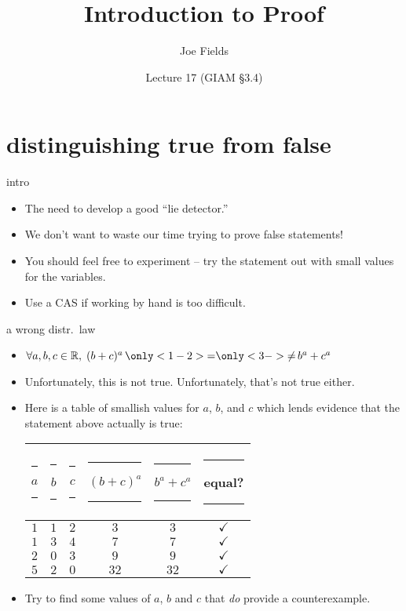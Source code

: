 \documentclass[handout,landscape]{beamer}
\author{Joe Fields}
\title{Introduction to Proof}
\date{Lecture 17 (GIAM \S 3.4)}
\institute[SCSU]{ {\tt fieldsj1@southernct.edu} }
\begin{document}
\begin{frame}[plain]
  \titlepage
\end{frame}

\section{distinguishing true from false}

\begin{frame}{intro}
\begin{itemize}
\item The need to develop a good ``lie detector.'' \pause
\item We don't want to waste our time trying to prove false statements! \pause
\item You should feel free to experiment -- try the statement out with small values for the variables. \pause
\item Use a CAS if working by hand is too difficult.
\end{itemize}
\end{frame}

\begin{frame}{a wrong distr.\ law}
\begin{itemize}
\item $\forall a,b,c \in \Reals, \; (b+c)^a \, \only<1-2>{=} \only<3->{\neq} \, b^a + c^a$ \pause
\item Unfortunately, this is not true. \pause \pause Unfortunately, that's not true either. \pause
\item Here is a table of smallish values for $a$, $b$, and $c$ which lends evidence that the statement above actually is true: \pause

\begin{tabular}{ccc|c|c|c}
\rule{6pt}{0pt} $a$ \rule{6pt}{0pt} & \rule{6pt}{0pt} $b$ \rule{6pt}{0pt} & \rule{6pt}{0pt} $c$ \rule{6pt}{0pt} & \rule{6pt}{0pt} $(b+c)^a$ \rule{6pt}{0pt} & \rule{6pt}{0pt} $b^a + c^a$ \rule{6pt}{0pt} & \rule{6pt}{0pt} equal? \rule{6pt}{0pt} \\ \hline
\rule[-4pt]{0pt}{20pt} $1$ & $1$ & $2$ & $3$ & $3$ & $\checkmark$ \\
\rule[-4pt]{0pt}{20pt} $1$ & $3$ & $4$ & $7$ & $7$ & $\checkmark$ \\
\rule[-4pt]{0pt}{20pt} $2$ & $0$ & $3$ & $9$ & $9$ & $\checkmark$ \\
\rule[-4pt]{0pt}{20pt} $5$ & $2$ & $0$ & $32$ & $32$ & $\checkmark$ \\
\end{tabular}
\pause

\item Try to find some values of $a$, $b$ and $c$ that {\em do} provide a counterexample.

\end{itemize}
\end{frame}
\end{document}
